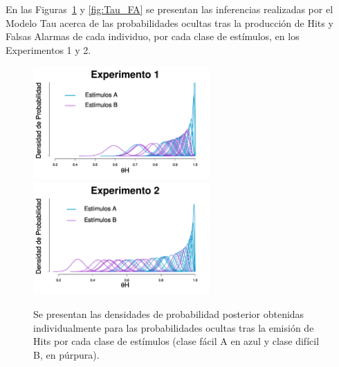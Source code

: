 En las Figuras~\ref{fig:Tau_Hits} y \ref{fig:Tau_FA} se presentan las inferencias realizadas por el Modelo Tau acerca de las probabilidades ocultas tras la producción de Hits y Falsas Alarmas de cada individuo, por cada clase de estímulos, en los Experimentos 1 y 2. \\

\begin{figure}[th]
\centering
\includegraphics[width=0.6\textwidth]{Figures/MTau_Hits_E1}\\
\includegraphics[width=0.6\textwidth]{Figures/MTau_Hits_E2}\\
\caption[Modelo Tau: Inferencias individuales acerca de las probabilidades ocultas tras la emisión de Hits por clase de estímulos; Experimentos 1 y 2]{Se presentan las densidades de probabilidad posterior obtenidas individualmente para las probabilidades ocultas tras la emisión de Hits por cada clase de estímulos (clase fácil A en azul y clase difícil B, en púrpura).}
\label{fig:Tau_Hits}
\end{figure}

